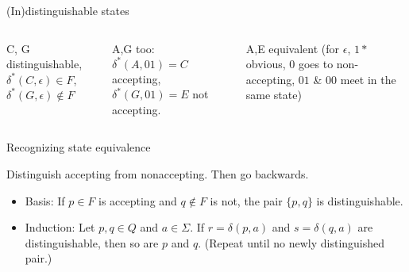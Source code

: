 \documentclass[handout]{beamer}
\begin{document}
\begin{frame}{(In)distinguishable states}
\begin{example}
\begin{columns}

            \small

            C, G distinguishable, $\delta^*(C,\epsilon)\in{ F}$, $\delta^*(G,\epsilon)\notin{ F}$

            \smallskip
                
            A,G too: $\delta^*(A,01)=C$ accepting, $\delta^*(G,01)=E$ not accepting.
            
            \smallskip

            A,E equivalent (for $\epsilon$, $1*$ obvious, $0$ goes to non-accepting, $01$ \& $00$ meet in the same state)

        \end{columns}

    \end{example}
            
\end{frame}


\begin{frame}{Recognizing state equivalence}

    Distinguish accepting from nonaccepting. Then go backwards.
    
    \begin{algorithm}    
        \begin{itemize}
            \item \alert{Basis:} If $p\in { F}$ is accepting and $q\notin{ F}$ is not, the pair  $ \{p,q\}$ is distinguishable.
            \item \alert{Induction:} Let $p,q\in Q$ and $a\in \Sigma$. If $r=\delta(p,a)$ and $s=\delta(q,a)$ are distinguishable, then so are $p$ and $q$. (Repeat until no newly distinguished pair.)
        \end{itemize}
    \end{algorithm}

\end{frame}
\end{document}
